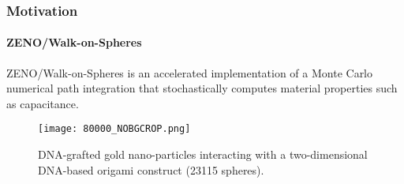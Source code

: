 \begin{frame}
  \frametitle{Motivation}
  \framesubtitle{ZENO/Walk-on-Spheres}

  {\color{white}\large%
  ZENO/Walk-on-Spheres is an accelerated implementation of a Monte Carlo
    numerical path integration that stochastically computes material properties
    such as capacitance.
  }

  \begin{figure}
    \centering
    \texttt{[image: 80000\_NOBGCROP.png]}
    \caption{DNA-grafted gold nano-particles interacting with a 
    two-dimensional DNA-based origami construct (23115 spheres).}
    \label{fig:80000}
  \end{figure}

\end{frame}

%


